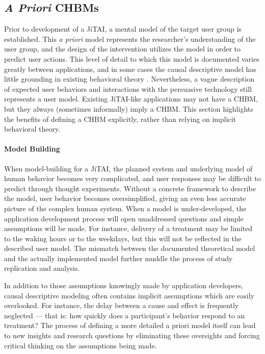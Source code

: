 \documentclass[runningheads,a4paper]{llncs}
\begin{document}
\subsection{\emph{A Priori} CHBMs}
Prior to development of a JiTAI, a mental model of the target user group is established.
This \emph{a priori} model represents the researcher's understanding of the user group, and the design of the intervention utilizes the model in order to predict user actions.
This level of detail to which this model is documented varies greatly between applications, and in some cases the causal descriptive model has little grounding in existing behavioral theory \cite{prestwich2014does}.
Nevertheless, a vague description of expected user behaviors and interactions with the persuasive technology still represents a user model.
Existing JiTAI-like applications may not have a CHBM, but they always (sometimes informally) imply a CHBM.
This section highlights the benefits of defining a CHBM explicitly, rather than relying on implicit behavioral theory.
\paragraph{Model Building}
When model-building for a JiTAI, the planned system and underlying model of human behavior becomes very complicated, and user responses may be difficult to predict through thought experiments.
Without a concrete framework to describe the model, user behavior becomes oversimplified, giving an even less accurate picture of the complex human system.
When a model is under-developed, the application development process will open unaddressed questions and simple assumptions will be made.
For instance, delivery of a treatment may be limited to the waking hours or to the weekdays, but this will not be reflected in the described user model.
The mismatch between the documented theoretical model and the actually implemented model further muddle the process of study replication and analysis.

In addition to those assumptions knowingly made by application developers, causal descriptive modeling often contains implicit assumptions which are easily overlooked.
For instance, the delay between a cause and effect is frequently neglected --- that is: how quickly does a participant's behavior respond to an treatment?
The process of defining a more detailed a priori model itself can lead to new insights and research questions by eliminating these oversights and forcing critical thinking on the assumptions being made.
\end{document}

